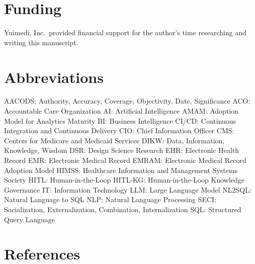 \documentclass[
  american,
  11pt,
  letterpaper,
  oneside  ,captions=tableheading
]{scrartcl}
\begin{document}
\section{Funding}\label{funding}

Yuimedi, Inc.~provided financial support for the author's time
researching and writing this manuscript.

\section{Abbreviations}\label{abbreviations}

AACODS: Authority, Accuracy, Coverage, Objectivity, Date, Significance
ACO: Accountable Care Organization AI: Artificial Intelligence AMAM:
Adoption Model for Analytics Maturity BI: Business Intelligence CI/CD:
Continuous Integration and Continuous Delivery CIO: Chief Information
Officer CMS: Centers for Medicare and Medicaid Services DIKW: Data,
Information, Knowledge, Wisdom DSR: Design Science Research EHR:
Electronic Health Record EMR: Electronic Medical Record EMRAM:
Electronic Medical Record Adoption Model HIMSS: Healthcare Information
and Management Systems Society HITL: Human-in-the-Loop HITL-KG:
Human-in-the-Loop Knowledge Governance IT: Information Technology LLM:
Large Language Model NL2SQL: Natural Language to SQL NLP: Natural
Language Processing SECI: Socialization, Externalization, Combination,
Internalization SQL: Structured Query Language

\section{References}\label{references}
\end{document}
